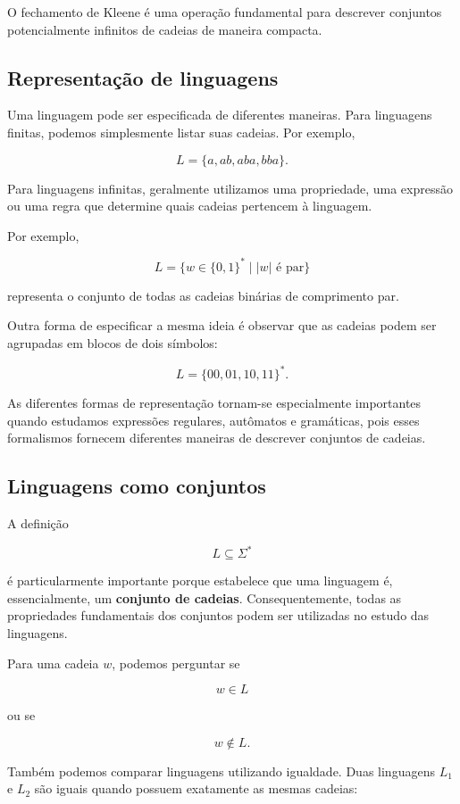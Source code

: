 \documentclass[
  brazilian,
  letterpaper,
]{book}
\theoremstyle{plain}
\theoremstyle{definition}
\theoremstyle{remark}
\begin{document}
O fechamento de Kleene é uma operação fundamental para descrever
conjuntos potencialmente infinitos de cadeias de maneira compacta.

\subsection{Representação de
linguagens}\label{representauxe7uxe3o-de-linguagens}

Uma linguagem pode ser especificada de diferentes maneiras. Para
linguagens finitas, podemos simplesmente listar suas cadeias. Por
exemplo,

\[
L=\{a,ab,aba,bba\}.
\]

Para linguagens infinitas, geralmente utilizamos uma propriedade, uma
expressão ou uma regra que determine quais cadeias pertencem à
linguagem.

Por exemplo,

\[
L=\{w\in\{0,1\}^*\mid |w|\text{ é par}\}
\]

representa o conjunto de todas as cadeias binárias de comprimento par.

Outra forma de especificar a mesma ideia é observar que as cadeias podem
ser agrupadas em blocos de dois símbolos:

\[
L=\{00,01,10,11\}^*.
\]

As diferentes formas de representação tornam-se especialmente
importantes quando estudamos expressões regulares, autômatos e
gramáticas, pois esses formalismos fornecem diferentes maneiras de
descrever conjuntos de cadeias.

\subsection{Linguagens como conjuntos}\label{linguagens-como-conjuntos}

A definição

\[
L\subseteq\Sigma^*
\]

é particularmente importante porque estabelece que uma linguagem é,
essencialmente, um \textbf{conjunto de cadeias}. Consequentemente, todas
as propriedades fundamentais dos conjuntos podem ser utilizadas no
estudo das linguagens.

Para uma cadeia \(w\), podemos perguntar se

\[
w\in L
\]

ou se

\[
w\notin L.
\]

Também podemos comparar linguagens utilizando igualdade. Duas linguagens
\(L_1\) e \(L_2\) são iguais quando possuem exatamente as mesmas
cadeias:
\end{document}
